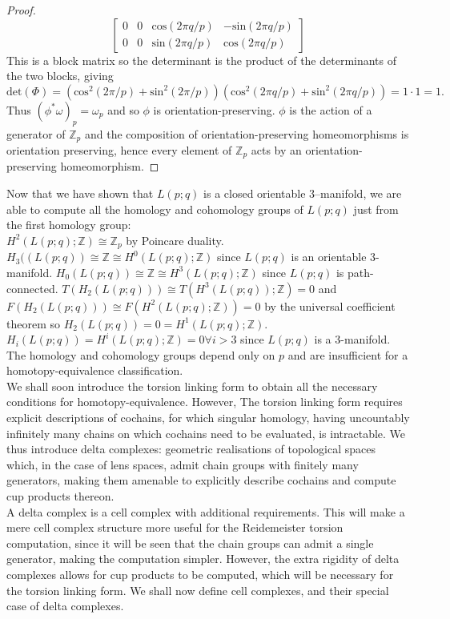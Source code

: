 \documentclass{article}
\begin{document}
\begin{proof}
\[\begin{bmatrix}
    0       & 0 & \text{cos}(2\pi q/p) & -\text{sin}(2\pi q/p) \\
    0       &0 & \text{sin}(2\pi q/p)  & \text{cos}(2\pi q/p)
\end{bmatrix}\]
This is a block matrix so the determinant is the product of the determinants of the two blocks, giving \[\text{det}(\Phi)=(\text{cos}^2(2\pi/p)+\text{sin}^2(2\pi/p))(\text{cos}^2(2\pi q/p)+\text{sin}^2(2\pi q/p))=1\cdot 1=1.\] Thus $(\phi^*\omega)_p=\omega_p$ and so $\phi$ is orientation-preserving. $\phi$ is the action of a generator of $\mathbb{Z}_p$ and the composition of orientation-preserving homeomorphisms is orientation preserving, hence every element of $\mathbb{Z}_p$ acts by an orientation-preserving homeomorphism.
\end{proof}
\noindent Now that we have shown that $L(p;q)$ is a closed orientable $3$--manifold, we are able to compute all the homology and cohomology groups of $L(p;q)$ just from the first homology group:\\

\noindent $H^2(L(p;q);\mathbb{Z})\cong\mathbb{Z}_p$ by Poincare duality. $H_3((L(p;q))\cong\mathbb{Z}\cong H^0(L(p;q);\mathbb{Z})$ since $L(p;q)$ is an orientable 3-manifold. $H_0(L(p;q))\cong\mathbb{Z}\cong H^3(L(p;q);\mathbb{Z})$ since $L(p;q)$ is path-connected. $T(H_2(L(p;q)))\cong T(H^3(L(p;q));\mathbb{Z})=0$ and $F(H_2(L(p;q)))\cong F(H^2(L(p;q);\mathbb{Z}))=0$ by the universal coefficient theorem so $H_2(L(p;q))=0=H^1(L(p;q);\mathbb{Z})$. $H_i(L(p;q))=H^i(L(p;q);\mathbb{Z})=0\forall i>3$ since $L(p;q)$ is a 3-manifold.\\

\noindent The homology and cohomology groups depend only on $p$ and are insufficient for a homotopy-equivalence classification.\\

\noindent We shall soon introduce the torsion linking form to obtain all the necessary conditions for homotopy-equivalence. However, The torsion linking form requires explicit descriptions of cochains, for which singular homology, having uncountably infinitely many chains on which cochains need to be evaluated, is intractable. We thus introduce delta complexes: geometric realisations of topological spaces which, in the case of lens spaces, admit chain groups with finitely many generators, making them amenable to explicitly describe cochains and compute cup products thereon.\\

\noindent A delta complex is a cell complex with additional requirements. This will make a mere cell complex structure more useful for the Reidemeister torsion computation, since it will be seen that the chain groups can admit a single generator, making the computation simpler. However, the extra rigidity of delta complexes allows for cup products to be computed, which will be necessary for the torsion linking form. We shall now define cell complexes, and their special case of delta complexes.
\end{document}
